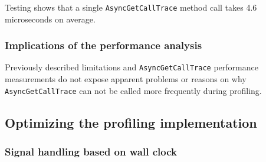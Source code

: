 \documentclass[..thesis.tex]{subfiles}
\begin{document}
Testing shows that a single \texttt{AsyncGetCallTrace} method call takes 4.6 microseconds on average.

\subsubsection{Implications of the performance analysis}
Previously described limitations and \texttt{AsyncGetCallTrace} performance measurements do not expose apparent problems or reasons on why \texttt{AsyncGetCallTrace} can not be called more frequently during profiling.

\subsection{Optimizing the profiling implementation}
\subsubsection{Signal handling based on wall clock}
\end{document}
